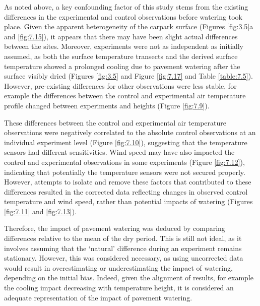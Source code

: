 \documentclass[final,3p,times,authoryear]{elsarticle}
\begin{document}
As noted above, a key confounding factor of this study stems from the existing differences in the experimental and control observations before watering took place. Given the apparent heterogeneity of the carpark surface (Figures \ref{fig:3.5}a and \ref{fig:7.15}), it appears that there may have been slight actual differences between the sites. Moreover, experiments were not as independent as initially assumed, as both the surface temperature transects and the derived surface temperature showed a prolonged cooling due to pavement watering after the surface visibly dried (Figures \ref{fig:3.5} and Figure \ref{fig:7.17} and Table \ref{table:7.5}). However, pre-existing differences for other observations were less stable, for example the differences between the control and experimental air temperature profile changed between experiments and heights (Figure \ref{fig:7.9}).

These differences between the control and experimental air temperature observations were negatively correlated to the absolute control observations at an individual experiment level (Figure \ref{fig:7.10}), suggesting that the temperature sensors had different sensitivities. Wind speed may have also impacted the control and experimental observations in some experiments (Figure \ref{fig:7.12}), indicating that potentially the temperature sensors were not secured properly. However, attempts to isolate and remove these factors that contributed to these differences resulted in the corrected data reflecting changes in observed control temperature and wind speed, rather than potential impacts of watering (Figures \ref{fig:7.11} and \ref{fig:7.13}).

Therefore, the impact of pavement watering was deduced by comparing differences relative to the mean of the dry period. This is still not ideal, as it involves assuming that the `natural' difference during an experiment remains stationary. However, this was considered necessary, as using uncorrected data would result in overestimating or underestimating the impact of watering, depending on the initial bias. Indeed, given the alignment of results, for example the cooling impact decreasing with temperature height, it is considered an adequate representation of the impact of pavement watering.
\end{document}
